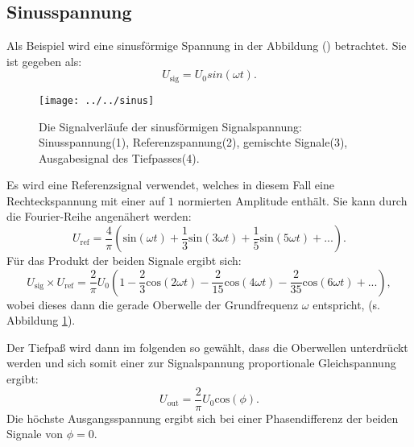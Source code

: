 \subsection{Sinusspannung}
Als Beispiel wird eine sinusförmige Spannung in der Abbildung () betrachtet. Sie ist gegeben als: 
\begin{equation*}
U_{\text{sig}} = U_{0}sin(\omega t).
\end{equation*}

\begin{figure}[h!]
	\centering
	\texttt{[image: ../../sinus]}
	\caption{Die Signalverläufe der sinusförmigen Signalspannung: Sinusspannung(1), Referenzspannung(2), gemischte Signale(3), Ausgabesignal des Tiefpasses(4). }
	\label{fig:sinus}
\end{figure}

Es wird eine Referenzsignal verwendet, welches in diesem Fall eine Rechteckspannung mit einer auf $1$ normierten Amplitude enthält. Sie kann durch die Fourier-Reihe angenähert werden:
\begin{equation*}
U_{\text{ref}} = \frac{4}{\pi} \left(\text{sin}(\omega t) + \frac{1}{3}\text{sin}(3\omega t) + \frac{1}{5}\text{sin}(5\omega t) + ... \right).
\end{equation*}
Für das Produkt der beiden Signale ergibt sich:
\begin{equation*}
U_{\text{sig}} \times U_{\text{ref}} = \frac{2}{\pi}U_{0} \left(1 - \frac{2}{3}\text{cos}(2 \omega t) - \frac{2}{15}\text{cos}(4 \omega t) - \frac{2}{35}\text{cos}(6 \omega t) + ... \right),
\end{equation*}
wobei dieses dann die gerade Oberwelle der Grundfrequenz $\omega$ entspricht, (s. Abbildung \ref{fig:sinus}).

Der Tiefpaß wird dann im folgenden so gewählt, dass die Oberwellen unterdrückt werden und sich somit einer zur Signalspannung proportionale Gleichspannung ergibt:
\begin{equation*}
U_{\text{out}} = \frac{2}{\pi}U_{0}\text{cos}(\phi).
\end{equation*}
Die höchste Ausgangsspannung ergibt sich bei einer Phasendifferenz der beiden Signale von $\phi = 0 $.